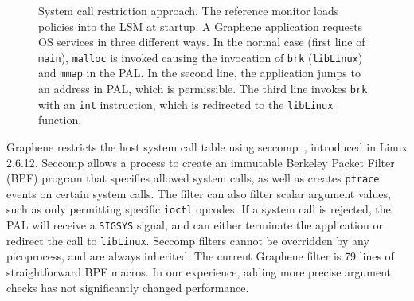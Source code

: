 
\begin{figure}[t!]
\centering
\footnotesize
\caption{System call restriction approach. The reference monitor loads policies into the LSM at startup.  A Graphene application requests OS services in three different ways. 
In the normal case (first line of {\tt main}), {\tt malloc} is invoked causing the invocation of {\tt brk} ({\tt libLinux}) and {\tt mmap} in the PAL. In the second line, the application jumps to an address in PAL, which is permissible.
The third line invokes {\tt brk} with an {\tt int} instruction, which is redirected to the {\tt libLinux} function.
\label{fig:syscall_restriction}}
\end{figure}



Graphene restricts the host system call table 
using seccomp~\citep{seccomp}, introduced in Linux 2.6.12.
Seccomp allows a process to create an immutable Berkeley Packet Filter (BPF) program
that specifies allowed system calls, as well as creates {\tt ptrace} 
events on certain system calls.
The filter can also filter scalar argument values,
such as only permitting specific {\tt ioctl} opcodes.
If a system call is rejected, the PAL will receive a {\tt SIGSYS} signal,
and can either terminate the application or redirect the 
call to {\tt libLinux}.
Seccomp filters cannot be overridden by any picoprocess,
and are always inherited.
The current Graphene filter is 79 lines 
of straightforward BPF macros.  In our experience, adding more precise argument checks
has not significantly changed performance.


